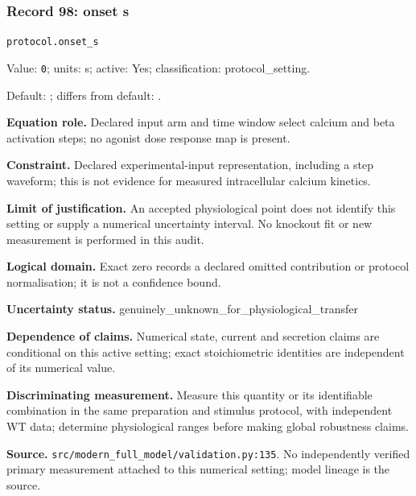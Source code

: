 \subsubsection*{Record 98: onset s}
{\small \nolinkurl{protocol.onset_s}\par

Value: \texttt{0}; units: s; active: Yes; classification: protocol\_setting.\par

Default: ; differs from default: .\par

\textbf{Equation role.} Declared input arm and time window select calcium and beta activation steps; no agonist dose response map is present.\par

\textbf{Constraint.} Declared experimental-input representation, including a step waveform; this is not evidence for measured intracellular calcium kinetics.\par

\textbf{Limit of justification.} An accepted physiological point does not identify this setting or supply a numerical uncertainty interval. No knockout fit or new measurement is performed in this audit.\par

\textbf{Logical domain.} Exact zero records a declared omitted contribution or protocol normalisation; it is not a confidence bound.\par

\textbf{Uncertainty status.} genuinely\_unknown\_for\_physiological\_transfer\par

\textbf{Dependence of claims.} Numerical state, current and secretion claims are conditional on this active setting; exact stoichiometric identities are independent of its numerical value.\par

\textbf{Discriminating measurement.} Measure this quantity or its identifiable combination in the same preparation and stimulus protocol, with independent WT data; determine physiological ranges before making global robustness claims.\par

\textbf{Source.} \nolinkurl{src/modern_full_model/validation.py:135}. No independently verified primary measurement attached to this numerical setting; model lineage is the source.\par}

